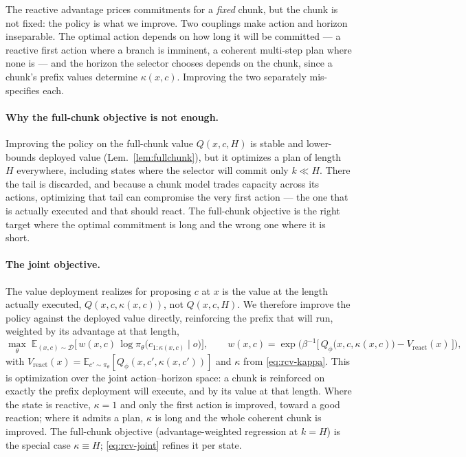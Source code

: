 The reactive advantage prices commitments for a \emph{fixed} chunk, but the chunk is not fixed: the
policy is what we improve. Two couplings make action and horizon inseparable. The optimal action
depends on how long it will be committed --- a reactive first action where a branch is imminent, a
coherent multi-step plan where none is --- and the horizon the selector chooses depends on the chunk,
since a chunk's prefix values determine $\kappa(x,c)$. Improving the two separately mis-specifies each.

\paragraph{Why the full-chunk objective is not enough.}
Improving the policy on the full-chunk value $Q(x,c,H)$ is stable and lower-bounds deployed value
(Lem.~\ref{lem:fullchunk}), but it optimizes a plan of length $H$ everywhere, including states where the
selector will commit only $k\ll H$. There the tail is discarded, and because a chunk model trades
capacity across its actions, optimizing that tail can compromise the very first action --- the one that
is actually executed and that should react. The full-chunk objective is the right target where the
optimal commitment is long and the wrong one where it is short.

\paragraph{The joint objective.}
The value deployment realizes for proposing $c$ at $x$ is the value at the length actually executed,
$Q(x, c, \kappa(x,c))$, not $Q(x,c,H)$. We therefore improve the policy against the deployed value
directly, reinforcing the prefix that will run, weighted by its advantage at that length,
\begin{equation}
\label{eq:rcv-joint}
\max_\theta\; \mathbb E_{(x, c)\sim\mathcal D}\Big[\,
w(x,c)\,\log \pi_\theta\big(c_{1:\kappa(x,c)} \mid o\big)\Big],
\qquad
w(x,c)=\exp\!\Big(\beta^{-1}\big[\,Q_\phi\big(x, c, \kappa(x,c)\big)-V_{\mathrm{react}}(x)\,\big]\Big),
\end{equation}
with $V_{\mathrm{react}}(x)=\mathbb E_{c'\sim\pi_\theta}[Q_\phi(x,c',\kappa(x,c'))]$ and $\kappa$ from
\eqref{eq:rcv-kappa}. This is optimization over the joint action--horizon space: a chunk is reinforced
on exactly the prefix deployment will execute, and by its value at that length. Where the state is
reactive, $\kappa=1$ and only the first action is improved, toward a good reaction; where it admits a
plan, $\kappa$ is long and the whole coherent chunk is improved. The full-chunk objective (advantage-weighted regression at $k=H$) is the special case $\kappa\equiv H$; \eqref{eq:rcv-joint} refines it per state.

